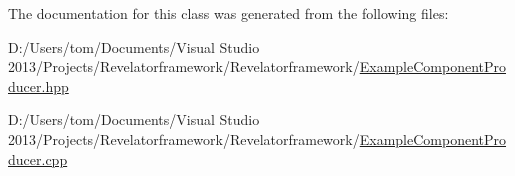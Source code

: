 The documentation for this class was generated from the following files\-:\begin{DoxyCompactItemize}
\item 
D\-:/\-Users/tom/\-Documents/\-Visual Studio 2013/\-Projects/\-Revelatorframework/\-Revelatorframework/\hyperlink{_example_component_producer_8hpp}{Example\-Component\-Producer.\-hpp}\item 
D\-:/\-Users/tom/\-Documents/\-Visual Studio 2013/\-Projects/\-Revelatorframework/\-Revelatorframework/\hyperlink{_example_component_producer_8cpp}{Example\-Component\-Producer.\-cpp}\end{DoxyCompactItemize}
